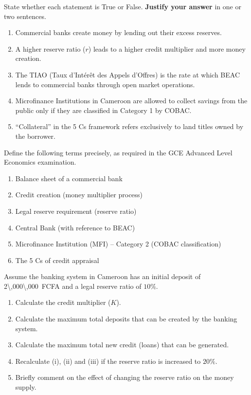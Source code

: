 \documentclass[11pt]{article}
\begin{document}
\begin{exercice}
State whether each statement is True or False. \textbf{Justify your answer} in one or two sentences.

\begin{enumerate}
\item Commercial banks create money by lending out their excess reserves.
\item A higher reserve ratio ($r$) leads to a higher credit multiplier and more money creation.
\item The TIAO (Taux d'Intérêt des Appels d'Offres) is the rate at which BEAC lends to commercial banks through open market operations.
\item Microfinance Institutions in Cameroon are allowed to collect savings from the public only if they are classified in Category 1 by COBAC.
\item ``Collateral'' in the 5 Cs framework refers exclusively to land titles owned by the borrower.
\end{enumerate}
\end{exercice}

\begin{exercice}
Define the following terms precisely, as required in the GCE Advanced Level Economics examination.

\begin{enumerate}
\item Balance sheet of a commercial bank
\item Credit creation (money multiplier process)
\item Legal reserve requirement (reserve ratio)
\item Central Bank (with reference to BEAC)
\item Microfinance Institution (MFI) -- Category 2 (COBAC classification)
\item The 5 Cs of credit appraisal
\end{enumerate}
\end{exercice}

\begin{exercice}
Assume the banking system in Cameroon has an initial deposit of \SI{2\,000\,000}{FCFA} and a legal reserve ratio of $10\%$.

\begin{enumerate}
\item Calculate the credit multiplier ($K$).
\item Calculate the maximum total deposits that can be created by the banking system.
\item Calculate the maximum total new credit (loans) that can be generated.
\item Recalculate (i), (ii) and (iii) if the reserve ratio is increased to $20\%$.
\item Briefly comment on the effect of changing the reserve ratio on the money supply.
\end{enumerate}
\end{exercice}
\end{document}
